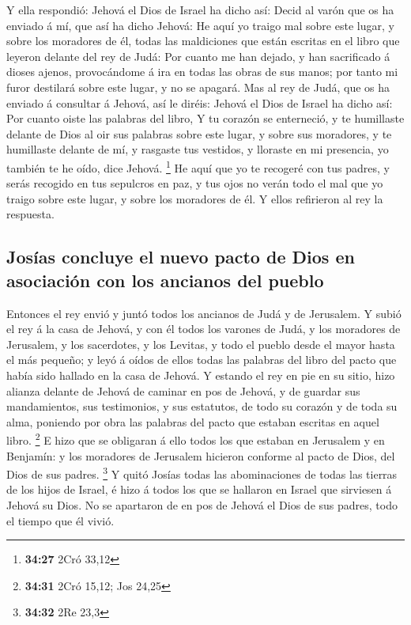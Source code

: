  Y ella respondió: Jehová el Dios de Israel ha dicho así:
Decid al varón que os ha enviado á mí, que así ha dicho Jehová:
 He aquí yo traigo mal sobre este lugar, y sobre los
moradores de él, todas las maldiciones que están escritas en el libro
que leyeron delante del rey de Judá:  Por cuanto me han
dejado, y han sacrificado á dioses ajenos, provocándome á ira en todas
las obras de sus manos; por tanto mi furor destilará sobre este lugar, y
no se apagará.  Mas al rey de Judá, que os ha enviado á
consultar á Jehová, así le diréis: Jehová el Dios de Israel ha dicho
así: Por cuanto oiste las palabras del libro,  Y tu
corazón se enterneció, y te humillaste delante de Dios al oir sus
palabras sobre este lugar, y sobre sus moradores, y te humillaste
delante de mí, y rasgaste tus vestidos, y lloraste en mi presencia, yo
también te he oído, dice Jehová. \footnote{\textbf{34:27} 2Cró 33,12}
 He aquí que yo te recogeré con tus padres, y serás
recogido en tus sepulcros en paz, y tus ojos no verán todo el mal que yo
traigo sobre este lugar, y sobre los moradores de él. Y ellos refirieron
al rey la respuesta.

\hypertarget{josuxedas-concluye-el-nuevo-pacto-de-dios-en-asociaciuxf3n-con-los-ancianos-del-pueblo}{%
\subsection{Josías concluye el nuevo pacto de Dios en asociación con los
ancianos del
pueblo}\label{josuxedas-concluye-el-nuevo-pacto-de-dios-en-asociaciuxf3n-con-los-ancianos-del-pueblo}}

 Entonces el rey envió y juntó todos los ancianos de Judá
y de Jerusalem.  Y subió el rey á la casa de Jehová, y
con él todos los varones de Judá, y los moradores de Jerusalem, y los
sacerdotes, y los Levitas, y todo el pueblo desde el mayor hasta el más
pequeño; y leyó á oídos de ellos todas las palabras del libro del pacto
que había sido hallado en la casa de Jehová.  Y estando
el rey en pie en su sitio, hizo alianza delante de Jehová de caminar en
pos de Jehová, y de guardar sus mandamientos, sus testimonios, y sus
estatutos, de todo su corazón y de toda su alma, poniendo por obra las
palabras del pacto que estaban escritas en aquel libro. \footnote{\textbf{34:31}
  2Cró 15,12; Jos 24,25}  E hizo que se obligaran á ello
todos los que estaban en Jerusalem y en Benjamín: y los moradores de
Jerusalem hicieron conforme al pacto de Dios, del Dios de sus padres.
\footnote{\textbf{34:32} 2Re 23,3}  Y quitó Josías todas
las abominaciones de todas las tierras de los hijos de Israel, é hizo á
todos los que se hallaron en Israel que sirviesen á Jehová su Dios. No
se apartaron de en pos de Jehová el Dios de sus padres, todo el tiempo
que él vivió.

